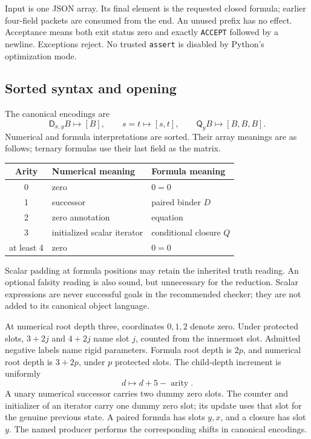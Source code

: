 \documentclass[11pt,letterpaper]{article}
\theoremstyle{definition}\newtheorem{definition}[theorem]{Definition}
\theoremstyle{remark}\newtheorem{remark}[theorem]{Remark}
\newcommand{\D}{\mathsf D}
\newcommand{\Q}{\mathsf Q}
\begin{document}
Input is one JSON array. Its final element is the requested closed
formula; earlier four-field packets are consumed from the end. An unused
prefix has no effect. Acceptance means both exit status zero and exactly
\texttt{ACCEPT} followed by a newline. Exceptions reject. No trusted
\texttt{assert} is disabled by Python's optimization mode.

\subsection{Sorted syntax and opening}

The canonical encodings are
\[
 \D_{x,y}B\mapsto[B],\qquad s=t\mapsto[s,t],
 \qquad\Q_yB\mapsto[B,B,B].
\]
Numerical and formula interpretations are sorted. Their array meanings
are as follows; ternary formulas use their last field as the matrix.
\begin{center}
\begin{tabular}{cll}\toprule
Arity & Numerical meaning & Formula meaning\\\midrule
0 & zero & \(0=0\)\\
1 & successor & paired binder \(D\)\\
2 & zero annotation & equation\\
3 & initialized scalar iterator & conditional closure \(Q\)\\
at least 4 & zero & \(0=0\)\\\bottomrule
\end{tabular}
\end{center}
Scalar padding at formula positions may retain the inherited truth
reading. An optional falsity reading is also sound, but unnecessary
for the reduction. Scalar expressions are never successful goals in
the recommended checker; they are not added to its canonical object
language.

At numerical root depth three, coordinates \(0,1,2\) denote zero.
Under protected slots, \(3+2j\) and \(4+2j\) name slot \(j\),
counted from the innermost slot. Admitted negative labels name rigid
parameters. Formula root depth is \(2p\), and numerical root depth
is \(3+2p\), under \(p\) protected slots. The child-depth increment
is uniformly
\[
                  d\longmapsto d+5-\operatorname{arity}.
\]
A unary numerical successor carries two dummy zero slots. The counter
and initializer of an iterator carry one dummy zero slot; its update
uses that slot for the genuine previous state. A paired formula has
slots \(y,x\), and a closure has slot \(y\). The named producer
performs the corresponding shifts in canonical encodings.
\end{document}
